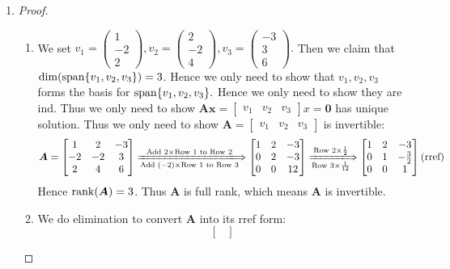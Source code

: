 \begin{enumerate}
\begin{proof}[Solution.]
\begin{enumerate}
\begin{itemize}
\[\]
\end{itemize}
\end{enumerate}
\end{proof}
\item
\begin{proof}
\begin{enumerate}
\item
We set $v_1=\begin{pmatrix}
1\\-2\\2
\end{pmatrix},v_2=\begin{pmatrix}
2\\-2\\4
\end{pmatrix},v_3=\begin{pmatrix}
-3\\3\\6
\end{pmatrix}.$ Then we claim that $\dim(\operatorname{span}\{v_1,v_2,v_3\}) = 3$. Hence we only need to show that $v_1,v_2,v_3$ forms the basis for $\operatorname{span} \{v_1,v_2,v_3\}.$ Hence we only need to show they are ind. Thus we only need to show $\bm{Ax} = \begin{bmatrix}
v_1&v_2&v_3
\end{bmatrix}x = \bm 0$ has unique solution. Thus we only need to show $\bm A = \begin{bmatrix}
v_1&v_2&v_3
\end{bmatrix}$ is invertible:
\[
\bm A = \begin{bmatrix}
1&2&-3\\-2&-2&3\\2&4&6
\end{bmatrix}\xLongrightarrow[\text{Add $(-2)\times$Row 1 to Row 3}]{\text{Add $2\times$Row 1 to Row 2}}
\begin{bmatrix}
1&2&-3\\0&2&-3\\0&0&12
\end{bmatrix}\xLongrightarrow[\text{Row 3$\times\frac{1}{12}$}]{\text{Row 2$\times\frac{1}{2}$}}
\begin{bmatrix}
1&2&-3\\0&1&-\frac{3}{2}\\0&0&1
\end{bmatrix}(\text{rref})
\]
Hence $\operatorname{rank}(\bm A) = 3$. Thus $\bm A$ is full rank, which means $\bm A$ is invertible.
\item
We do elimination to convert $\bm A$ into its rref form:
\[
\begin{bmatrix}

\end{bmatrix}\]
\end{enumerate}
\end{proof}
\end{enumerate}
